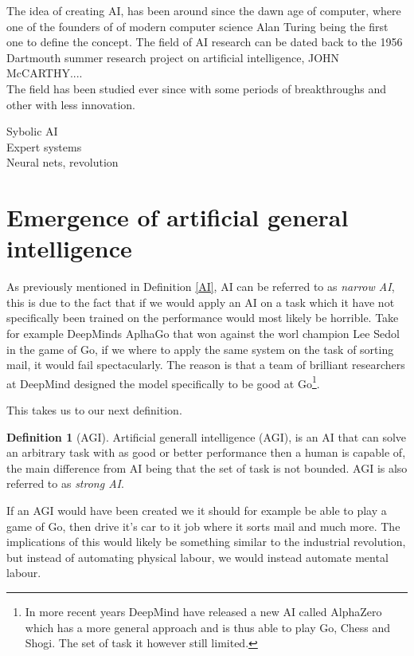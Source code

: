 \documentclass{report}
\theoremstyle{definition}
\newtheorem{definition}{Definition}[section]
\begin{document}
The idea of creating AI, has been around since the dawn age of computer, where one of the founders of of modern computer science Alan Turing being the first one to define the concept. The field of AI research can be dated back to the 1956 Dartmouth summer research project on artificial intelligence, JOHN McCARTHY.... \\

The field has been studied ever since with some periods of breakthroughs and other with less innovation. 

Sybolic AI\\

Expert systems\\

Neural nets, revolution\\

\section{Emergence of artificial general intelligence}

As previously mentioned in Definition \ref{AI}, AI can be referred to as \textit{narrow AI}, this is due to the fact that if we would apply an AI on a task which it have not specifically been trained on the performance would most likely be horrible. Take for example DeepMinds AplhaGo that won against the worl champion Lee Sedol in the game of Go, if we where to apply the same system on the task of sorting mail, it would fail spectacularly. The reason is that a team of brilliant researchers at DeepMind designed the model specifically to be good at Go\footnote{In more recent years DeepMind have released a new AI called AlphaZero which has a more general approach and is thus able to play Go, Chess and Shogi. The set of task it however still limited.}. 

This takes us to our next definition.
\begin{definition}[AGI]
    Artificial generall intelligence (AGI), is an AI that can solve an arbitrary task with as good or better performance then a human is capable of, the main difference from AI being that the set of task is not bounded. AGI is also referred to as \textit{strong AI}.
\end{definition}
If an AGI would have been created we it should for example be able to play a game of Go, then drive it's car to it job where it sorts mail and much more. The implications of this would likely be something similar to the industrial revolution, but instead of automating physical labour, we would instead automate mental labour. 
\end{document}
